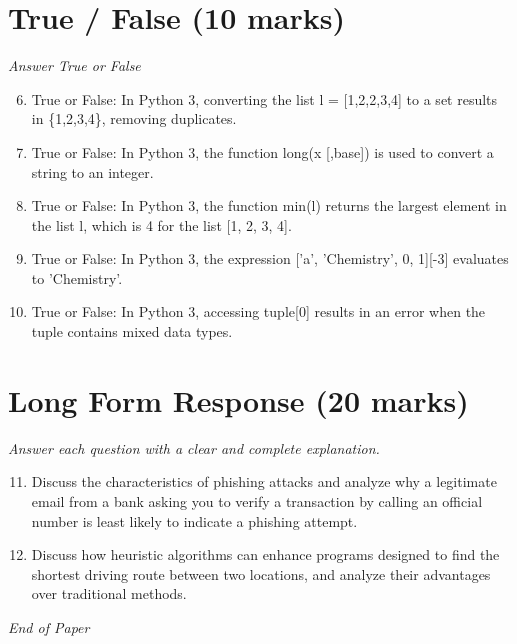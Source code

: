 \documentclass[12pt]{article}
\begin{document}
\section*{True / False (10 marks)}
\textit{Answer True or False}
\begin{enumerate}[label=\arabic*.]
\setcounter{enumi}{5}
\item True or False: In Python 3, converting the list l = [1,2,2,3,4] to a set results in \{1,2,3,4\}, removing duplicates.
\item True or False: In Python 3, the function long(x [,base]) is used to convert a string to an integer.
\item True or False: In Python 3, the function min(l) returns the largest element in the list l, which is 4 for the list [1, 2, 3, 4].
\item True or False: In Python 3, the expression ['a', 'Chemistry', 0, 1][-3] evaluates to 'Chemistry'.
\item True or False: In Python 3, accessing tuple[0] results in an error when the tuple contains mixed data types.
\end{enumerate}

\section*{Long Form Response (20 marks)}
\textit{Answer each question with a clear and complete explanation.}
\begin{enumerate}[label=\arabic*.]
\setcounter{enumi}{10}
\item Discuss the characteristics of phishing attacks and analyze why a legitimate email from a bank asking you to verify a transaction by calling an official number is least likely to indicate a phishing attempt.
\item Discuss how heuristic algorithms can enhance programs designed to find the shortest driving route between two locations, and analyze their advantages over traditional methods.
\end{enumerate}

\vfill
\noindent\textit{End of Paper}
\end{document}
